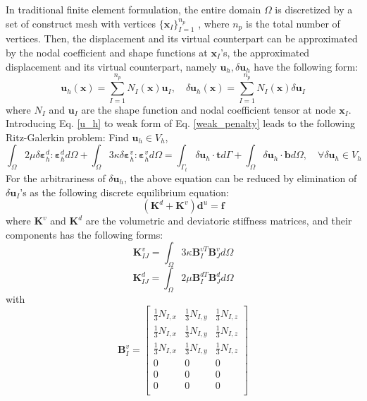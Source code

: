 In traditional finite element formulation, the entire domain $\Omega$ is discretized by a set of construct mesh with vertices $\{\boldsymbol x_I\}_{I=1}^{n_p}$ \cite{hughes2000}, where $n_p$ is the total number of vertices. Then, the displacement and its virtual counterpart can be approximated by the nodal coefficient and shape functions at $\boldsymbol x_I$'s, the approximated displacement and its virtual counterpart, namely $\boldsymbol u_h, \delta \boldsymbol u_h$ have the following form: 
\begin{equation}\label{u_h}
\boldsymbol u_h(\boldsymbol x) = \sum_{I=1}^{n_p} N_I(\boldsymbol x) \boldsymbol u_I, \quad
\delta \boldsymbol u_h(\boldsymbol x) = \sum_{I=1}^{n_p} N_I(\boldsymbol x) \delta \boldsymbol u_I
\end{equation}
where $N_I$ and $\boldsymbol u_I$ are the shape function and nodal coefficient tensor at node $\boldsymbol x_I$.
Introducing Eq. \eqref{u_h} to weak form of Eq. \eqref{weak_penalty} leads to the following Ritz-Galerkin problem:
Find $\boldsymbol u_h \in V_h$,
\begin{equation}\label{ritz_penalty}
\int_\Omega 2\mu \delta \boldsymbol \varepsilon^d_h : \boldsymbol \varepsilon^d_h d\Omega +
\int_\Omega 3\kappa \delta \boldsymbol \varepsilon^v_h : \boldsymbol \varepsilon^v_h d\Omega =
\int_{\Gamma_t} \delta \boldsymbol u_h \cdot \boldsymbol t d\Gamma + \int_\Omega \delta \boldsymbol u_h \cdot \boldsymbol b d\Omega,  \quad
\forall \delta \boldsymbol u_h \in V_h
\end{equation}
For the arbitrariness of $\delta \boldsymbol u_h$, the above equation can be reduced by elimination of $\delta \boldsymbol u_I$'s as the following discrete equilibrium equation:
\begin{equation}
(\boldsymbol K^d + \boldsymbol K^v) \boldsymbol d^u = \boldsymbol f
\end{equation}
where $\boldsymbol K^v$ and $\boldsymbol K^d$ are the volumetric and deviatoric stiffness matrices, and their components has the following forms:
\begin{equation}\label{stiffness_vol}
\boldsymbol K^v_{IJ} = \int_{\Omega} 3\kappa \boldsymbol B^{vT}_I \boldsymbol B^v_J d\Omega
\end{equation}
\begin{equation}
\boldsymbol K^d_{IJ} = \int_{\Omega} 2\mu \boldsymbol B^{dT}_I \boldsymbol B^d_J d\Omega
\end{equation}
with
\begin{equation}
\boldsymbol B^v_I =
\begin{bmatrix}
    \frac{1}{3}N_{I,x} & \frac{1}{3}N_{I,y} & \frac{1}{3}N_{I,z} \\
    \frac{1}{3}N_{I,x} & \frac{1}{3}N_{I,y} & \frac{1}{3}N_{I,z} \\
    \frac{1}{3}N_{I,x} & \frac{1}{3}N_{I,y} & \frac{1}{3}N_{I,z} \\
    0 & 0 & 0 \\
    0 & 0 & 0 \\
    0 & 0 & 0 \\
\end{bmatrix}
\end{equation}
